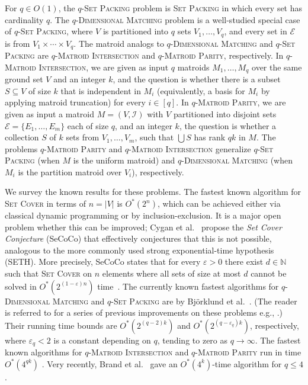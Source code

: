 \documentclass{theoretics}
\newcommand{\N}{\ensuremath{\mathbb N}\xspace}
\newcommand{\cI}{\ensuremath{\mathcal I}\xspace}
\newcommand{\cE}{\ensuremath{\mathcal E}\xspace}
\begin{document}
For $q \in O(1)$, 
the \textsc{$q$-Set Packing} problem is \textsc{Set Packing} in which every set has cardinality $q$.
The \textsc{$q$-Dimensional Matching} problem is a well-studied special case of \textsc{$q$-Set Packing}, where $V$ is partitioned into $q$ sets $V_1, \dots, V_q$, and every set in $\cE$ is from $V_1 \times \cdots \times V_q$.
The matroid analogs to \textsc{$q$-Dimensional Matching} and \textsc{$q$-Set Packing} are \textsc{$q$-Matroid Intersection} and \textsc{$q$-Matroid Parity}, respectively.
In \textsc{$q$-Matroid Intersection}, we are given as input $q$ matroids $M_1, \dots, M_q$ over the same ground set $V$ and an integer $k$, and the question is whether there is a subset $S \subseteq V$ of size $k$ that is independent in $M_i$ (equivalently, a basis for $M_i$ by applying matroid truncation) for every $i \in [q]$.
In \textsc{$q$-Matroid Parity}, we are given as input a matroid $M = (V, \cI)$ with $V$ partitioned into disjoint sets $\cE = \{ E_1, \dots, E_m \}$ each of size $q$, and an integer $k$, the question is whether a collection $S$ of $k$ sets from $V_1, \dots, V_m$, such that $\bigcup S$ has rank $qk$ in $M$.
The problems \textsc{$q$-Matroid Parity} and \textsc{$q$-Matroid Intersection} generalize \textsc{$q$-Set Packing} (when $M$ is the uniform matroid) and \textsc{$q$-Dimensional Matching} (when $M_i$ is the partition matroid over $V_i$), respectively.

We survey the known results for these problems.
The fastest known algorithm for \textsc{Set Cover}
in terms of $n=|V|$ is $O^*(2^n)$, which can be achieved either via
classical dynamic programming or by inclusion-exclusion. It is a major
open problem whether this can be improved; Cygan et al.~\cite{CyganDLMNOPSW16seth}
propose the \emph{Set Cover Conjecture} (SeCoCo) that effectively
conjectures that this is not possible, analogous to the more commonly
used strong exponential-time hypothesis (SETH).
More precisely, SeCoCo states that for every $\varepsilon > 0$
there exist $d \in \N$ such that \textsc{Set Cover}
on $n$ elements where all sets of size at most $d$
cannot be solved in $O^*(2^{(1-\varepsilon)n})$ time~\cite{CyganDLMNOPSW16seth}.
The currently known fastest algorithms for \textsc{$q$-Dimensional Matching} and \textsc{$q$-Set Packing} are by Bj\"orklund et al.~\cite{BjorklundHKK17narrow}.
(The reader is referred to \cite{BjorklundHKK17narrow} for a series of previous improvements on these problems e.g., \cite{Chen09,Koutis08ICALP,KoutisW09limits}.)
Their running time bounds are $O^*(2^{(q-2)k})$ and $O^*(2^{(q-\varepsilon_q)k})$, respectively, where $\varepsilon_q < 2$ is a constant depending on $q$, tending to zero as $q \to \infty$.
The fastest known algorithms for \textsc{$q$-Matroid Intersection} and \textsc{$q$-Matroid Parity} run in time $O^*(4^{qk})$ \cite{BrandP21}.
Very recently, Brand et al.~\cite{BrandKS23} gave an $O^*(4^k)$-time algorithm for $q \le 4$.
\end{document}
